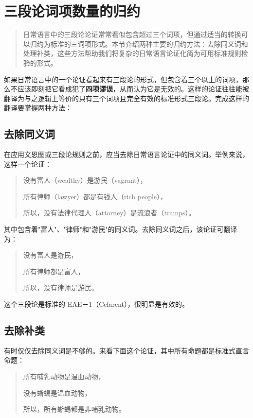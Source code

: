 \section{三段论词项数量的归约}

\begin{quotation}
日常语言中的三段论论证常常看似包含超过三个词项，但通过适当的转换可以归约为标准的三词项形式。本节介绍两种主要的归约方法：去除同义词和处理补类，这些方法帮助我们将复杂的日常语言论证化简为可用标准规则检验的形式。
\end{quotation}

如果日常语言中的一个论证看起来有三段论的形式，但包含着三个以上的词项，那么不应该即刻把它看成犯了\textbf{四项谬误}，从而认为它是无效的。这样的论证往往能被翻译为与之逻辑上等价的只有三个词项且完全有效的标准形式三段论。完成这样的翻译要掌握两种方法：

\subsection{去除同义词}
在应用文恩图或三段论规则之前，应当去除日常语言论证中的同义词。举例来说，这样一个论证：

\begin{quote}
没有富人（wealthy）是游民（vagrant），

所有律师（lawyer）都是有钱人（rich people），

所以，没有法律代理人（attorney）是流浪者（tramps）。
\end{quote}

其中包含着"富人"、"律师"和"游民"的同义词。去除同义词之后，该论证可翻译为：

\begin{quote}
没有富人是游民，

所有律师都是富人，

所以，没有律师是游民。
\end{quote}

这个三段论是标准的 EAE－1（Celarent），很明显是有效的。

\subsection{去除补类}
有时仅仅去除同义词是不够的。来看下面这个论证，其中所有命题都是标准式直言命题：

\begin{quote}
所有哺乳动物是温血动物，

没有蜥蜴是温血动物，

所以，所有蜥蜴都是非哺乳动物。
\end{quote}

